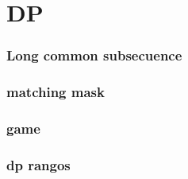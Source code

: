 \newpage
\section{DP}

\subsubsection{Long common subsecuence}


\subsubsection{matching mask}


\subsubsection{game}


\subsubsection{dp rangos}


\newpage

